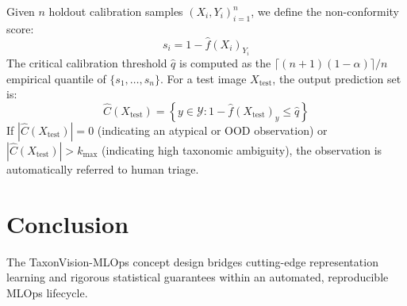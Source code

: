 \documentclass[11pt,a4paper]{article}
\begin{document}
Given $n$ holdout calibration samples $(X_i, Y_i)_{i=1}^n$, we define the non-conformity score:
\begin{equation}
    s_i = 1 - \hat{f}(X_i)_{Y_i}
\end{equation}
The critical calibration threshold $\hat{q}$ is computed as the $\lceil (n+1)(1-\alpha) \rceil / n$ empirical quantile of $\{s_1, \ldots, s_n\}$.
For a test image $X_{\text{test}}$, the output prediction set is:
\begin{equation}
    \hat{C}(X_{\text{test}}) = \left\{ y \in \mathcal{Y} : 1 - \hat{f}(X_{\text{test}})_y \le \hat{q} \right\}
\end{equation}
If $|\hat{C}(X_{\text{test}})| = 0$ (indicating an atypical or OOD observation) or $|\hat{C}(X_{\text{test}})| > k_{\text{max}}$ (indicating high taxonomic ambiguity), the observation is automatically referred to human triage.

\section{Conclusion}
The TaxonVision-MLOps concept design bridges cutting-edge representation learning and rigorous statistical guarantees within an automated, reproducible MLOps lifecycle.



\end{document}

